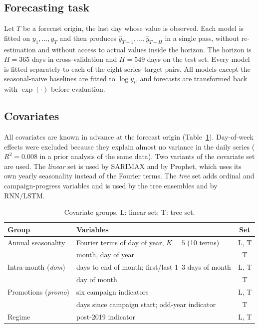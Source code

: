 \documentclass[conference]{IEEEtran}
\begin{document}
\subsection{Forecasting task}
Let $T$ be a forecast origin, the last day whose value is observed.
Each model is fitted on $y_1,\dots,y_T$ and then produces $\hat y_{T+1},\dots,\hat y_{T+H}$ in a single pass, without re-estimation and without access to actual values inside the horizon.
The horizon is $H=365$ days in cross-validation and $H=549$ days on the test set.
Every model is fitted separately to each of the eight series--target pairs.
All models except the seasonal-naive baselines are fitted to $\log y_t$, and forecasts are transformed back with $\exp(\cdot)$ before evaluation.

\subsection{Covariates}
All covariates are known in advance at the forecast origin (Table~\ref{tab:covariates}).
Day-of-week effects were excluded because they explain almost no variance in the daily series ($R^2=0.008$ in a prior analysis of the same data).
Two variants of the covariate set are used.
The \emph{linear} set is used by SARIMAX and by Prophet, which uses its own yearly seasonality instead of the Fourier terms.
The \emph{tree} set adds ordinal and campaign-progress variables and is used by the tree ensembles and by RNN/LSTM.

\begin{table}[t]\centering
\caption{Covariate groups. L: linear set; T: tree set.}\label{tab:covariates}
\footnotesize
\begin{tabular}{@{}llc@{}}
\toprule
Group & Variables & Set \\
\midrule
Annual seasonality & Fourier terms of day of year, $K=5$ (10 terms) & L, T \\
 & month, day of year & T \\
Intra-month (\emph{dom}) & days to end of month; first/last 1--3 days of month & L, T \\
 & day of month & T \\
Promotions (\emph{promo}) & six campaign indicators & L, T \\
 & days since campaign start; odd-year indicator & T \\
Regime & post-2019 indicator & L, T \\
\bottomrule
\end{tabular}
\end{table}
\end{document}
